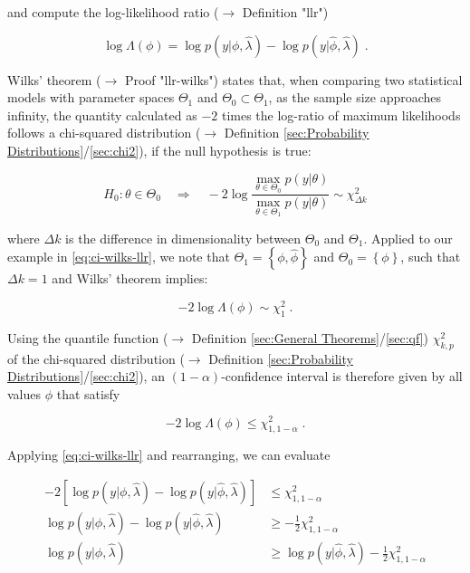 \documentclass[a4paper,12pt,twoside]{book}
\begin{document}
and compute the log-likelihood ratio ($\rightarrow$ Definition "llr")

\begin{equation} \label{eq:ci-wilks-llr}
\log \Lambda(\phi) = \log p(y|\phi,\hat{\lambda}) - \log p(y|\hat{\phi},\hat{\lambda}) \; .
\end{equation}

Wilks' theorem ($\rightarrow$ Proof "llr-wilks") states that, when comparing two statistical models with parameter spaces $\Theta_1$ and $\Theta_0 \subset \Theta_1$, as the sample size approaches infinity, the quantity calculated as $-2$ times the log-ratio of maximum likelihoods follows a chi-squared distribution ($\rightarrow$ Definition \ref{sec:Probability Distributions}/\ref{sec:chi2}), if the null hypothesis is true:

\begin{equation} \label{eq:ci-wilks-wilks}
H_0: \theta \in \Theta_0 \quad \Rightarrow \quad -2 \log \frac{\operatorname*{max}_{\theta \in \Theta_0} p(y|\theta)}{\operatorname*{max}_{\theta \in \Theta_1} p(y|\theta)} \sim \chi^2_{\Delta k}
\end{equation}

where $\Delta k$ is the difference in dimensionality between $\Theta_0$ and $\Theta_1$. Applied to our example in \eqref{eq:ci-wilks-llr}, we note that $\Theta_1 = \left\lbrace \phi, \hat{\phi} \right\rbrace$ and $\Theta_0 = \left\lbrace \phi \right\rbrace$, such that $\Delta k = 1$ and Wilks' theorem implies:

\begin{equation} \label{eq:ci-wilks-llr-wilks}
-2 \log \Lambda(\phi) \sim  \chi^2_1 \; .
\end{equation}

Using the quantile function ($\rightarrow$ Definition \ref{sec:General Theorems}/\ref{sec:qf}) $\chi^2_{k,p}$ of the chi-squared distribution ($\rightarrow$ Definition \ref{sec:Probability Distributions}/\ref{sec:chi2}), an $(1-\alpha)$-confidence interval is therefore given by all values $\phi$ that satisfy

\begin{equation} \label{eq:ci-wilks-llr-chi2}
-2 \log \Lambda(\phi) \leq \chi^2_{1,1-\alpha} \; .
\end{equation}

Applying \eqref{eq:ci-wilks-llr} and rearranging, we can evaluate

\begin{equation} \label{eq:ci-wilks-llr-chi2-dev}
\begin{split}
-2 \left[ \log p(y|\phi,\hat{\lambda}) - \log p(y|\hat{\phi},\hat{\lambda}) \right] &\leq \chi^2_{1,1-\alpha} \\
\log p(y|\phi,\hat{\lambda}) - \log p(y|\hat{\phi},\hat{\lambda}) &\geq -\frac{1}{2} \chi^2_{1,1-\alpha} \\
\log p(y|\phi,\hat{\lambda}) &\geq \log p(y|\hat{\phi},\hat{\lambda}) - \frac{1}{2} \chi^2_{1,1-\alpha}
\end{split}
\end{equation}
\end{document}
